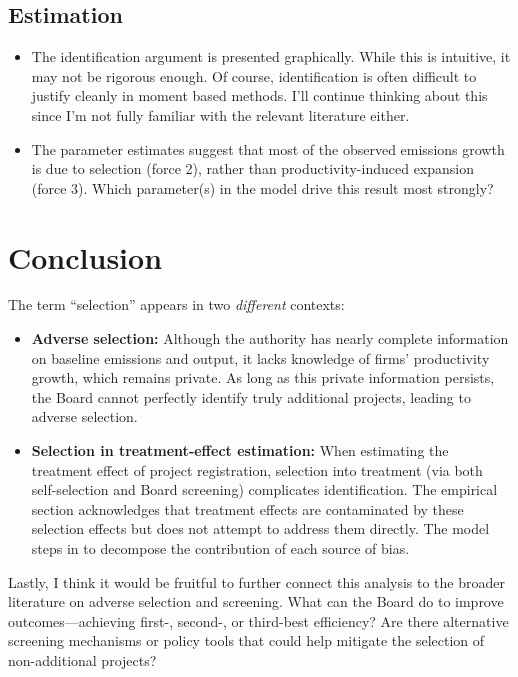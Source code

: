 \documentclass[12pt]{article}[margin=1in]
\begin{document}
\subsection{Estimation}

\begin{itemize}
    \item The identification argument is presented graphically. While this is intuitive, it may not be rigorous enough. Of course, identification is often difficult to justify cleanly in moment based methods. I’ll continue thinking about this since I’m not fully familiar with the relevant literature either.

    \item The parameter estimates suggest that most of the observed emissions growth is due to selection (force 2), rather than productivity-induced expansion (force 3). Which parameter(s) in the model drive this result most strongly?
\end{itemize}

\section{Conclusion}

The term ``selection'' appears in two \emph{different} contexts:

\begin{itemize}
    \item \textbf{Adverse selection:} Although the authority has nearly complete information on baseline emissions and output, it lacks knowledge of firms’ productivity growth, which remains private. As long as this private information persists, the Board cannot perfectly identify truly additional projects, leading to adverse selection.

    \item \textbf{Selection in treatment-effect estimation:} When estimating the treatment effect of project registration, selection into treatment (via both self-selection and Board screening) complicates identification. The empirical section acknowledges that treatment effects are contaminated by these selection effects but does not attempt to address them directly. The model steps in to decompose the contribution of each source of bias.
\end{itemize}

Lastly, I think it would be fruitful to further connect this analysis to the broader literature on adverse selection and screening. What can the Board do to improve outcomes—achieving first-, second-, or third-best efficiency? Are there alternative screening mechanisms or policy tools that could help mitigate the selection of non-additional projects?

\pagebreak \newpage 
\end{document}
